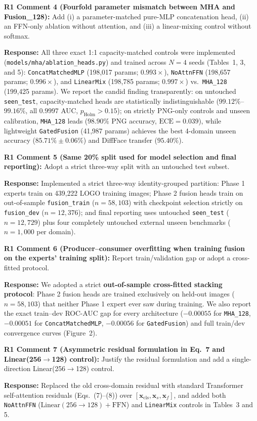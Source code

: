 \documentclass[11pt,a4paper]{article}
\newcommand{\reviewercomment}[2]{%
  \vspace{0.6em}\noindent\begin{tcolorbox}[colback=boxbg,colframe=revcolor,boxrule=0.6pt,left=6pt,right=6pt,top=4pt,bottom=4pt]
  \textbf{\color{revcolor}#1:} #2
  \end{tcolorbox}
}
\newcommand{\authorresponse}[1]{%
  \noindent\textbf{\color{respcolor}Response:} #1\par\vspace{0.5em}
}
\begin{document}
\reviewercomment{R1 Comment 4 (Fourfold parameter mismatch between MHA and Fusion\_128)}{Add (i) a parameter-matched pure-MLP concatenation head, (ii) an FFN-only ablation without attention, and (iii) a linear-mixing control without softmax.}
\authorresponse{All three exact 1:1 capacity-matched controls were implemented (\texttt{models/mha/ablation\_heads.py}) and trained across $N=4$ seeds (Tables~1, 3, and 5): \texttt{ConcatMatchedMLP} (198,017 params; $0.993\times$), \texttt{NoAttnFFN} (198,657 params; $0.996\times$), and \texttt{LinearMix} (198,785 params; $0.997\times$) vs.\ \texttt{MHA\_128} (199,425 params). We report the candid finding transparently: on untouched \texttt{seen\_test}, capacity-matched heads are statistically indistinguishable ($99.12\%$--$99.16\%$, all $0.9997$ AUC, $p_{\text{Holm}}>0.15$); on strictly PNG-only controls and unseen calibration, \texttt{MHA\_128} leads ($98.90\%$ PNG accuracy, $\text{ECE}=0.039$), while lightweight \texttt{GatedFusion} (41,987 params) achieves the best 4-domain unseen accuracy ($85.71\% \pm 0.06\%$) and DiffFace transfer ($95.40\%$).}

\reviewercomment{R1 Comment 5 (Same 20\% split used for model selection and final reporting)}{Adopt a strict three-way split with an untouched test subset.}
\authorresponse{Implemented a strict three-way identity-grouped partition: Phase 1 experts train on 439,222 LOGO training images; Phase 2 fusion heads train on out-of-sample \texttt{fusion\_train} ($n=58,103$) with checkpoint selection strictly on \texttt{fusion\_dev} ($n=12,376$); and final reporting uses untouched \texttt{seen\_test} ($n=12,729$) plus four completely untouched external unseen benchmarks ($n=1,000$ per domain).}

\reviewercomment{R1 Comment 6 (Producer--consumer overfitting when training fusion on the experts' training split)}{Report train/validation gap or adopt a cross-fitted protocol.}
\authorresponse{We adopted a strict \textbf{out-of-sample cross-fitted stacking protocol}: Phase 2 fusion heads are trained exclusively on held-out images ($n=58,103$) that neither Phase 1 expert ever saw during training. We also report the exact train--dev ROC-AUC gap for every architecture ($-0.00055$ for \texttt{MHA\_128}, $-0.00051$ for \texttt{ConcatMatchedMLP}, $-0.00056$ for \texttt{GatedFusion}) and full train/dev convergence curves (Figure~2).}

\reviewercomment{R1 Comment 7 (Asymmetric residual formulation in Eq.\ 7 and Linear(256$\to$128) control)}{Justify the residual formulation and add a single-direction Linear(256$\to$128) control.}
\authorresponse{Replaced the old cross-domain residual with standard Transformer self-attention residuals (Eqs.\ (7)--(8)) over $[\mathbf{x}_{\text{cls}}, \mathbf{x}_s, \mathbf{x}_f]$, and added both \texttt{NoAttnFFN} ($\text{Linear}(256\to 128)+\text{FFN}$) and \texttt{LinearMix} controls in Tables~3 and 5.}
\end{document}
